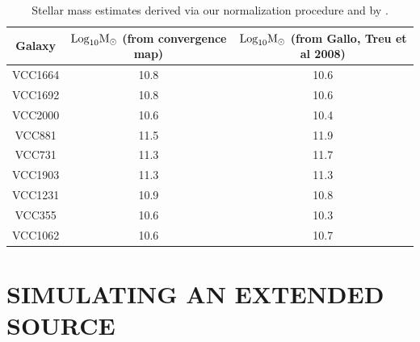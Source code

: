 \begin{table}
	\centering
	\label{table:stellar_mass}
	\caption{Stellar mass estimates derived via our normalization procedure and by \cite{Gal++08b}.}
	\begin{tabular}{c c c}
		\hline
		Galaxy & $\rm{Log}_{10} M_{\odot}$ (from convergence map) & $\rm{Log}_{10} M_{\odot}$ (from Gallo, Treu et al 2008)\\
		\hline
		VCC1664 & 10.8 & 10.6 \\
		VCC1692 & 10.8 & 10.6 \\
		VCC2000 & 10.6 & 10.4 \\
		VCC881 & 11.5 & 11.9 \\
		VCC731 & 11.3 & 11.7 \\
		VCC1903 & 11.3 & 11.3 \\ 
		VCC1231 & 10.9 & 10.8 \\ 
		VCC355 & 10.6 & 10.3 \\
		VCC1062 & 10.6 & 10.7 \\
		\hline 
	\end{tabular}
\end{table}

\section{\bf SIMULATING AN EXTENDED SOURCE}
\label{app:B}

